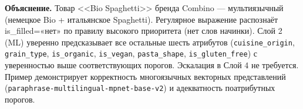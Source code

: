 \noindent\textbf{Объяснение.} Товар <<Bio Spaghetti>> бренда Combino — мультиязычный (немецкое Bio + итальянское Spaghetti). Регулярное выражение распознаёт is\_filled=«нет» по правилу высокого приоритета (нет слов начинки). Слой 2 (ML) уверенно предсказывает все остальные шесть атрибутов (\texttt{cuisine\_origin}, \texttt{grain\_type}, \texttt{is\_organic}, \texttt{is\_vegan}, \texttt{pasta\_shape}, \texttt{is\_gluten\_free}) с уверенностью выше соответствующих порогов. Эскалация в Слой 4 не требуется. Пример демонстрирует корректность многоязычных векторных представлений (\texttt{paraphrase-multilingual-mpnet-base-v2}) и адекватность поатрибутных порогов.

\medskip
